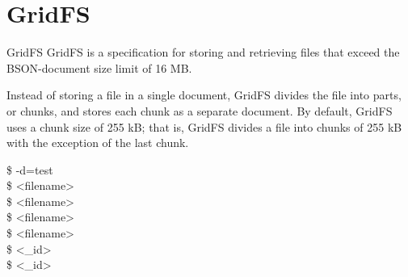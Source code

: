 \documentclass{beamer}
\begin{document}
\section{GridFS}
\begin{frame}{GridFS}
	GridFS is a specification for storing and retrieving files that exceed the BSON-document size limit of 16 MB.
	\vspace{0.05\textheight}
	
	\begin{minipage}[t]{0.45\textwidth}
		Instead of storing a file in a single document, GridFS divides the file into parts, or chunks, and stores each chunk as a separate document. By default, GridFS uses a chunk size of 255 kB; that is, GridFS divides a file into chunks of 255 kB with the exception of the last chunk.
	\end{minipage}%
	\hfill
	\begin{minipage}[t]{0.45\textwidth}
		\scriptsize
		\begin{Alms*}
		 \$  -d=test \\
         \$   <filename>\\
         \$   <filename>\\
         \$   <filename>\\
         \$   <filename>\\
         \$   <\_id>\\
         \$   <\_id>\\
		\end{Alms*}
	\end{minipage}
\end{frame}
\end{document}
